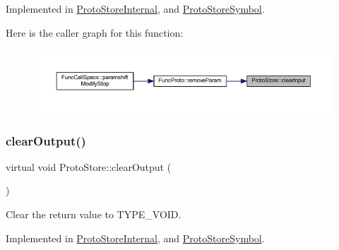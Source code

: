 Implemented in \mbox{\hyperlink{class_proto_store_internal_ae3948caba06771c1df6dea3af57d55c1}{Proto\+Store\+Internal}}, and \mbox{\hyperlink{class_proto_store_symbol_aa36f84c14205c90e18708858a3ae4ae5}{Proto\+Store\+Symbol}}.

Here is the caller graph for this function\+:
\nopagebreak
\begin{figure}[H]
\begin{center}
\leavevmode
\includegraphics[width=350pt]{class_proto_store_afa6361ac313cdd2ccef1531209389cdc_icgraph}
\end{center}
\end{figure}
\mbox{\label{class_proto_store_a02928f3bab6c98f728a1759e3127e5c4}} 
\subsubsection{\texorpdfstring{clearOutput()}{clearOutput()}}
{\footnotesize\ttfamily virtual void Proto\+Store\+::clear\+Output (\begin{DoxyParamCaption}\item[{void}]{ }\end{DoxyParamCaption})\hspace{0.3cm}{\ttfamily [pure virtual]}}



Clear the return value to T\+Y\+P\+E\+\_\+\+V\+O\+ID. 



Implemented in \mbox{\hyperlink{class_proto_store_internal_a8d17ecfc29c19b63b9d462462887017f}{Proto\+Store\+Internal}}, and \mbox{\hyperlink{class_proto_store_symbol_aadbd3a9fba172e28405eeb0001292bff}{Proto\+Store\+Symbol}}.

